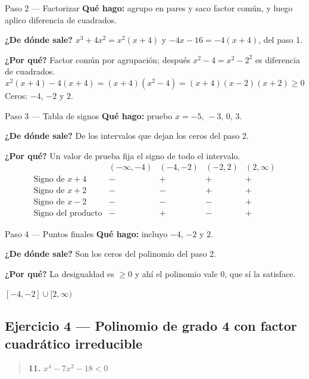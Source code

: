 \documentclass[11pt]{article}
\begin{document}
\begin{paso}{Paso 2 --- Factorizar}
\textbf{Qué hago:} agrupo en pares y saco factor común, y luego aplico diferencia de cuadrados.

\textbf{¿De dónde sale?} $x^3+4x^2=x^2(x+4)$ y $-4x-16=-4(x+4)$, del paso 1.

\textbf{¿Por qué?} Factor común por agrupación; después $x^2-4=x^2-2^2$ es diferencia de cuadrados.
\[
x^2(x+4)-4(x+4)=(x+4)(x^2-4)=(x+4)(x-2)(x+2)\ge 0
\]
Ceros: $-4$, $-2$ y $2$.
\end{paso}

\begin{paso}{Paso 3 --- Tabla de signos}
\textbf{Qué hago:} pruebo $x=-5,\,-3,\,0,\,3$.

\textbf{¿De dónde sale?} De los intervalos que dejan los ceros del paso 2.

\textbf{¿Por qué?} Un valor de prueba fija el signo de todo el intervalo.
\[
\begin{array}{l|cccc}
 & (-\infty,-4) & (-4,-2) & (-2,2) & (2,\infty)\\\hline
\text{Signo de } x+4 & - & + & + & +\\
\text{Signo de } x+2 & - & - & + & +\\
\text{Signo de } x-2 & - & - & - & +\\\hline
\text{Signo del producto} & - & + & - & +
\end{array}
\]
\end{paso}

\begin{paso}{Paso 4 --- Puntos finales}
\textbf{Qué hago:} incluyo $-4$, $-2$ y $2$.

\textbf{¿De dónde sale?} Son los ceros del polinomio del paso 2.

\textbf{¿Por qué?} La desigualdad es $\ge 0$ y ahí el polinomio vale $0$, que sí la satisface.
\end{paso}

\begin{resp}
$[-4,-2]\cup[2,\infty)$
\end{resp}

\subsection*{Ejercicio 4 — Polinomio de grado 4 con factor cuadrático irreducible}

\begin{quote}
\textbf{11.} $x^4-7x^2-18<0$
\end{quote}
\end{document}
